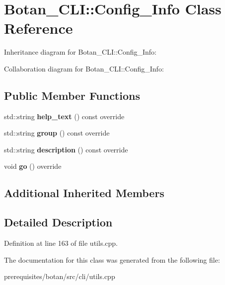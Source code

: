 \hypertarget{class_botan___c_l_i_1_1_config___info}{}\section{Botan\+\_\+\+C\+LI\+:\+:Config\+\_\+\+Info Class Reference}
\label{class_botan___c_l_i_1_1_config___info}


Inheritance diagram for Botan\+\_\+\+C\+LI\+:\+:Config\+\_\+\+Info\+:


Collaboration diagram for Botan\+\_\+\+C\+LI\+:\+:Config\+\_\+\+Info\+:
\subsection*{Public Member Functions}
\begin{DoxyCompactItemize}
\item 
\mbox{\label{class_botan___c_l_i_1_1_config___info_a8f4aa61ca388b64ecf19985d97b5e4dc}} 
std\+::string {\bfseries help\+\_\+text} () const override
\item 
\mbox{\label{class_botan___c_l_i_1_1_config___info_aac1209b3a893492f93235fadba553a63}} 
std\+::string {\bfseries group} () const override
\item 
\mbox{\label{class_botan___c_l_i_1_1_config___info_aa9a8bf66287e91c93fc16f33f7130dae}} 
std\+::string {\bfseries description} () const override
\item 
\mbox{\label{class_botan___c_l_i_1_1_config___info_a4f3676a8b945de3455c3ed4b64c1bb35}} 
void {\bfseries go} () override
\end{DoxyCompactItemize}
\subsection*{Additional Inherited Members}


\subsection{Detailed Description}


Definition at line 163 of file utils.\+cpp.



The documentation for this class was generated from the following file\+:\begin{DoxyCompactItemize}
\item 
prerequisites/botan/src/cli/utils.\+cpp\end{DoxyCompactItemize}
